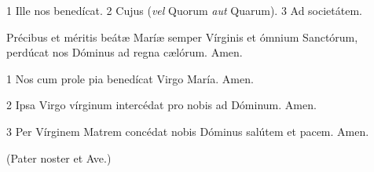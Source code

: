  1 Ille nos benedícat. 2 Cujus (\textit{vel} Quorum \textit{aut} Quarum). 3 Ad societátem.


 Précibus et méritis beátæ Maríæ semper Vírginis et ómnium Sanctórum, perdúcat nos Dóminus ad regna cælórum. Amen.

 1 Nos cum prole pia benedícat Virgo María. Amen.

2 Ipsa Virgo vírginum intercédat pro nobis ad Dóminum. Amen.

3 Per Vírginem Matrem concédat nobis Dóminus salútem et pacem. Amen.



(Pater noster et Ave.)

